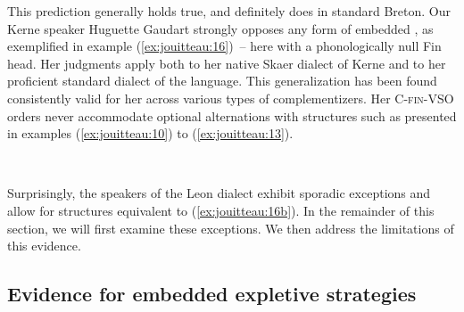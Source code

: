 \documentclass[output=paper,colorlinks,citecolor=brown]{langscibook}
\begin{document}
This prediction generally holds true, and definitely does in standard Breton. Our Kerne speaker Huguette Gaudart strongly opposes any form of embedded , as exemplified in example (\ref{ex:jouitteau:16})~– here with a phonologically null Fin head. Her judgments apply both to her native Skaer dialect of Kerne and to her proficient standard dialect of the language. This generalization has been found consistently valid for her across various types of complementizers. Her C-\textsc{fin}-VSO orders never accommodate optional alternations with structures such as presented in examples (\ref{ex:jouitteau:10}) to (\ref{ex:jouitteau:13}).

\ea \label{ex:jouitteau:16} \\
    \z
    \z
     
\noindent Surprisingly, the speakers of the Leon dialect exhibit sporadic exceptions and allow for structures equivalent to (\ref{ex:jouitteau:16b}). In the remainder of this section, we will first examine these exceptions. We then address the limitations of this evidence. 

\subsection{Evidence for embedded expletive strategies}
\end{document}
